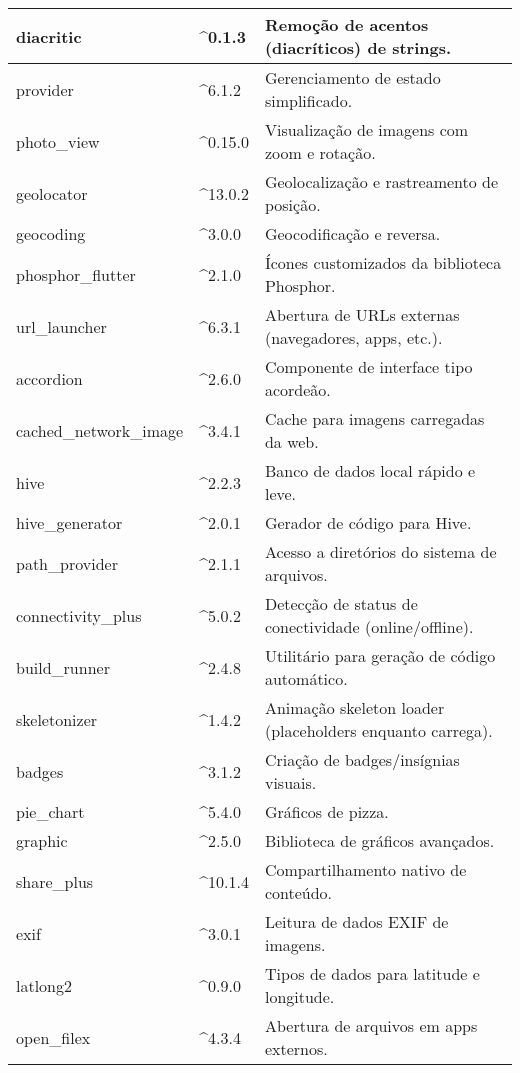 \begin{table}[H]
\begin{tabular}{|p{4cm}|p{2.5cm}|p{8cm}|}
    diacritic & \^{}0.1.3 & Remoção de acentos (diacríticos) de strings. \\ \hline
    provider & \^{}6.1.2 & Gerenciamento de estado simplificado. \\ \hline
    photo\_view & \^{}0.15.0 & Visualização de imagens com zoom e rotação. \\ \hline
    geolocator & \^{}13.0.2 & Geolocalização e rastreamento de posição. \\ \hline
    geocoding & \^{}3.0.0 & Geocodificação e reversa. \\ \hline
    phosphor\_flutter & \^{}2.1.0 & Ícones customizados da biblioteca Phosphor. \\ \hline
    url\_launcher & \^{}6.3.1 & Abertura de URLs externas (navegadores, apps, etc.). \\ \hline
    accordion & \^{}2.6.0 & Componente de interface tipo acordeão. \\ \hline
    cached\_network\_image & \^{}3.4.1 & Cache para imagens carregadas da web. \\ \hline
    hive & \^{}2.2.3 & Banco de dados local rápido e leve. \\ \hline
    hive\_generator & \^{}2.0.1 & Gerador de código para Hive. \\ \hline
    path\_provider & \^{}2.1.1 & Acesso a diretórios do sistema de arquivos. \\ \hline
    connectivity\_plus & \^{}5.0.2 & Detecção de status de conectividade (online/offline). \\ \hline
    build\_runner & \^{}2.4.8 & Utilitário para geração de código automático. \\ \hline
    skeletonizer & \^{}1.4.2 & Animação skeleton loader (placeholders enquanto carrega). \\ \hline
    badges & \^{}3.1.2 & Criação de badges/insígnias visuais. \\ \hline
    pie\_chart & \^{}5.4.0 & Gráficos de pizza. \\ \hline
    graphic & \^{}2.5.0 & Biblioteca de gráficos avançados. \\ \hline
    share\_plus & \^{}10.1.4 & Compartilhamento nativo de conteúdo. \\ \hline
    exif & \^{}3.0.1 & Leitura de dados EXIF de imagens. \\ \hline
    latlong2 & \^{}0.9.0 & Tipos de dados para latitude e longitude. \\ \hline
    open\_filex & \^{}4.3.4 & Abertura de arquivos em apps externos. \\ \hline

\end{tabular}
\end{table}
